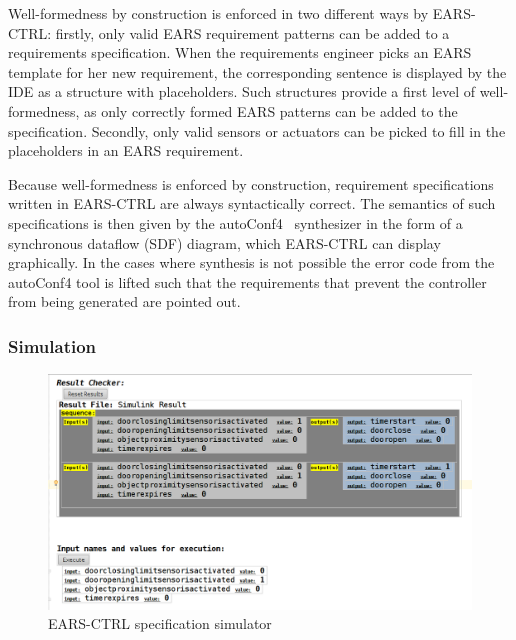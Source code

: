 Well-formedness by construction is enforced in two different ways by
\textsf{EARS-CTRL}: firstly, only valid EARS requirement patterns can be added
to a requirements specification. When the requirements engineer picks an EARS
template for her new requirement, the corresponding sentence is displayed by the
IDE as a structure with placeholders. Such structures provide a first level of
well-formedness, as only correctly formed EARS patterns can be added to the
specification. Secondly, only valid sensors or actuators can be picked to fill
in the placeholders in an EARS requirement.

Because well-formedness is enforced by construction, requirement specifications
written in \textsf{EARS-CTRL} are always syntactically correct. The semantics of
such specifications is then given by the \textsf{autoConf4}~\cite{autoCode17}
synthesizer in the form of a synchronous dataflow (SDF) diagram, which
\textsf{EARS-CTRL} can display graphically. In the cases where synthesis is not
possible the error code from the \textsf{autoConf4} tool is lifted such that the
requirements that prevent the controller from being generated are pointed out.

\subsubsection{Simulation}

\begin{figure}[h!]
   \begin{center}
     \includegraphics[width=1\textwidth]{images/simulation.png}
     \caption{\textsf{EARS-CTRL} specification simulator}
     \label{fig:ears_simulator}
   \end{center}
 \end{figure}

